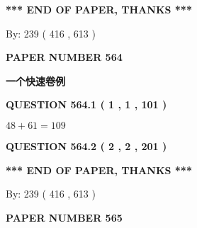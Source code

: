 \documentclass{ctexart}
\begin{document}
   
   
\vspace{1.0in} 
{\textbf{\large{ *** END OF PAPER, THANKS *** }}} 
   
   
\hspace{1.0in} By: 
 239 ( 416 ,  613 )
   
   
   
   
\newpage 
\setcounter{page}{ 
   564001 } 
   
   
   
   
 {\textbf{ \Large{ PAPER NUMBER  564  }}}
   
   
\vspace{0.2in}
   
   
   
   
   
   
 \vspace{0.2in}
{\LARGE {\textbf{ 一个快速卷例}}}
   
   
  
\vspace{0.2in}
  
{\textbf{\Large{QUESTION
564.1 
 ( 1 , 1 , 101 )
}}}
  
  
 
 

$ %
48 +  %
61=   %
109$
 
 
  
\vspace{0.2in}
  
{\textbf{\Large{QUESTION
564.2 
 ( 2 , 2 , 201 )
}}}
  
  
   
   
 \vspace{0.2in}
 
   
   
   
   
\vspace{1.0in} 
{\textbf{\large{ *** END OF PAPER, THANKS *** }}} 
   
   
\hspace{1.0in} By: 
 239 ( 416 ,  613 )
   
   
   
   
\newpage 
\setcounter{page}{ 
   565001 } 
   
   
   
   
 {\textbf{ \Large{ PAPER NUMBER  565  }}}
   
   
\vspace{0.2in}
   
\end{document}
